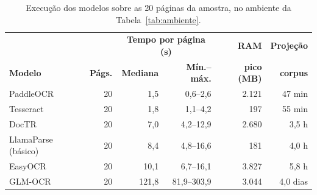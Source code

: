 \begin{table}[htb]
\centering
\caption{Execução dos modelos sobre as 20 páginas da amostra, no ambiente da
Tabela~\ref{tab:ambiente}.}
\label{tab:extracao_resumo}
\renewcommand{\arraystretch}{1.25}
{\small
\begin{tabular}{l r r r r r}
\hline
& & \multicolumn{2}{c}{\textbf{Tempo por página (s)}} & \textbf{RAM} & \textbf{Projeção} \\
\textbf{Modelo} & \textbf{Págs.} & \textbf{Mediana} & \textbf{Mín.--máx.} & \textbf{pico (MB)} & \textbf{corpus} \\
\hline
PaddleOCR & 20 & 1,5 & 0,6--2,6 & 2.121 & 47 min \\
Tesseract & 20 & 1,8 & 1,1--4,2 & 197 & 55 min \\
DocTR & 20 & 7,0 & 4,2--12,9 & 2.680 & 3,5 h \\
LlamaParse (básico) & 20 & 8,4 & 4,8--16,6 & 181 & 4,0 h \\
EasyOCR & 20 & 10,1 & 6,7--16,1 & 3.827 & 5,8 h \\
GLM-OCR & 20 & 121,8 & 81,9--303,9 & 3.044 & 4,0 dias \\
\hline
\end{tabular}
}
\end{table}
